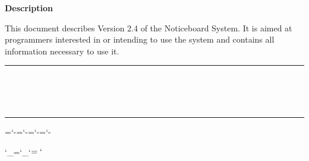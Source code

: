 \begin{center}
{\Large\bf Description}
\end{center}

\noindent This document describes Version 2.4 of the Noticeboard System. It
is aimed at programmers interested in or intending to use the system and
contains all information necessary to use it.

\newpage
\markright{\stardocname}
\null\vspace {5mm}
\begin {center}
\rule{80mm}{0.5mm} \\ [1ex]
{\Large\bf \stardoctitle \\ [2.5ex]
           \stardocversion} \\ [2ex]
\rule{80mm}{0.5mm}
\end{center}

\setlength{\parskip}{0mm}
\tableofcontents
\setlength{\parskip}{\medskipamount}

%
%
%
%
%



\hyphenchar\nintt=`-\hyphenchar\tentt=`-\hyphenchar\elvtt=`-\hyphenchar\twltt=`-

\lccode`_=`_\lccode`$=`$

\renewcommand{\_}{{\tt\char'137}}

%
%                                 
%

%
%
%

